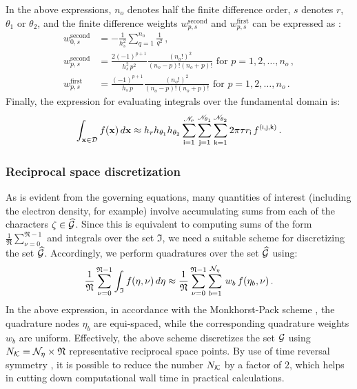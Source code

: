 \documentclass[preprint,12pt, 3p, sort&compress]{elsarticle}
\begin{document}
In the above expressions, $n_o$ denotes half the finite difference order, $s$ denotes $r$, $\theta_1$ or $\theta_2$, and the finite difference weights $w_{p,s}^{\text{second}}$ and ${w}_{p,s}^{\text{first}}$ can be expressed as \citep{mazziotti1999spectral}:
 \begin{align}
w_{0,s}^{\text{second}} & =  - \frac{1}{h_s^2} \sum_{q=1}^{n_o} \frac{1}{q^2} \,, \,\,
\nonumber \\\nonumber
w_{p,s}^{\text{second}}  & =  \frac{2 (-1)^{p+1}}{h_s^2\,p^2} \frac{(n_o!)^2}{(n_o-p)! (n_o+p)!} \,\,\text{for}\,\,p=1, 2, \ldots, n_o\,,\\
{w}_{p,s}^{\text{first}} & =  \frac{(-1)^{p+1}}{h_s\,p} \frac{(n_o!)^2}{(n_o-p)! (n_o+p)!}\,\,\text{for}\,\,p=1, 2, \ldots, n_o\,.
\label{eq:FD_weights}
\end{align}
Finally, the expression for evaluating integrals over the fundamental domain is:
\begin{align}
\int_{{\bf x} \in {\cal D}}f({\bf x})\,d{\bf x} \approx  h_r h_{\theta_1} h_{\theta_2} \sum_{\mathsf{i}=1}^{\mathscr{N}_r} \sum_{\mathsf{j} =1}^{\mathscr{N}_{\theta_1}} \sum_{\mathsf{k}=1}^{\mathscr{N}_{\theta_2}} 2\pi\tau r_{\mathsf{i}}\,f^{(\mathsf{i}, \mathsf{j}, \mathsf{k})}\,.
\end{align}
\subsubsection{Reciprocal space discretization}
\label{subsubsec:rec_space_discretization}
As is evident from the governing equations, many quantities of interest (including the electron density, for example) involve accumulating sums from each of the characters $\zeta \in \widehat{{\cal G}}$. Since this is equivalent to computing sums of the form $\displaystyle \frac{1}{\mathfrak{N}}\sum_{\nu =0}^{\mathfrak{N}-1}$ and integrals over the set ${\mathfrak{I}}$, we need a suitable scheme for discretizing the set $\widehat{{\cal G}}$. Accordingly, we perform quadratures over the set $\widehat{{\cal G}}$ using:
\begin{align}
\frac{1}{\mathfrak{N}}\sum_{\nu =0}^{\mathfrak{N}-1}\int_{\mathfrak{I}} f(\eta, \nu)\,d\eta \approx \frac{1}{\mathfrak{N}}\sum_{\nu =0}^{\mathfrak{N}-1} \sum_{{b=1}}^{{\cal N}_{\eta}}\,w_b\,f(\eta_b, \nu)\,.
\label{eq:MP_Scheme}
\end{align}
In the above expression, in accordance with the Monkhorst-Pack scheme \citep{monkhorst1976special}, the quadrature nodes $\eta_b$ are equi-spaced, while the corresponding quadrature weights $w_b$ are uniform. Effectively, the above scheme discretizes the set ${\cal G}$ using $N_{{\cal K}} = {\cal N}_{\eta} \times \mathfrak{N}$ representative reciprocal space points. By use of time reversal symmetry \citep{geru2018time, ghosh2019symmetry, banerjee2021ab}, it is possible to reduce the number $N_{{\cal K}}$ by a factor of $2$, which helps in cutting down computational wall time in practical calculations.  
\end{document}
